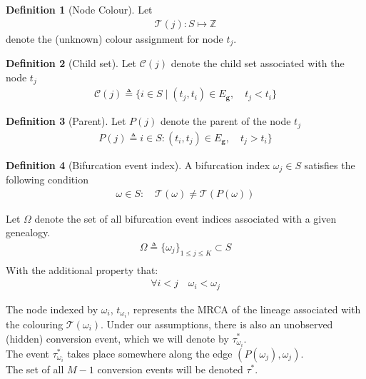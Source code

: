 \documentclass{report}
\newcommand{\Z}{\mathbb{Z}}
\theoremstyle{definition}
\newtheorem{definition}{Definition}[section]
\begin{document}
\begin{definition}[Node Colour]
Let
\begin{gather}
\mathcal{T}(j): S \mapsto \Z
\end{gather}
denote the (unknown) colour assignment for node $t_j$.
\end{definition}

\begin{definition}[Child set]
Let $\mathcal{C}(j)$ denote the child set associated with the node $t_j$
\begin{gather}
\mathcal{C}(j)\triangleq\{i\in S\mid(t_j, t_i)\in E_{\mathbf{g}},\quad t_j<t_i\}
\end{gather}
\end{definition}


\begin{definition}[Parent]
Let $P(j)$ denote the parent of the node $t_j$
\begin{gather}
P(j)\triangleq i\in S:(t_i, t_j)\in E_{\mathbf{g}},\quad t_j>t_i\}
\end{gather}
\end{definition}

\begin{definition}[Bifurcation event index]
A bifurcation index $\omega_j\in S$ satisfies the following condition
\begin{gather}
\omega\in S:\quad \mathcal{T}(\omega) \neq \mathcal{T}(P(\omega))
\end{gather}
\end{definition}

Let $\Omega$ denote the set of all bifurcation event indices associated with a given genealogy.
\begin{gather}
\Omega \triangleq \{\omega_j\}_{1\leq j\leq K}\subset S\\
\end{gather}
With the additional property that:
\begin{gather*}
\forall i<j \quad \omega_i < \omega_j
\end{gather*}

The node indexed by $\omega_i$, $t_{\omega_i}$, represents the MRCA of the lineage associated with the colouring $\mathcal{T}(\omega_i)$. Under our assumptions, there is also an unobserved (hidden) conversion event, which we will denote by $\tau^*_{\omega_i}$.\\ The event $\tau^*_{\omega_i}$ takes place somewhere along the edge $(P(\omega_j), \omega_j)$.\\
The set of all $M-1$ conversion events will be denoted $\tau^*$.
\end{document}
